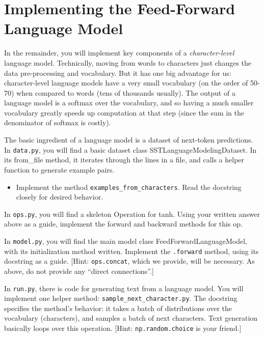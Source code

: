 \documentclass[11pt]{article}
\begin{document}
\section{Implementing the Feed-Forward Language Model}

In the remainder, you will implement key components of a \emph{character-level} language model.  Technically, moving from words to characters just changes the data pre-processing and vocabulary.  But it has one big advantage for us: character-level language models have a very small vocabulary (on the order of 50-70) when compared to words (tens of thousands usually).  The output of a language model is a softmax over the vocabulary, and so having a much smaller vocabulary greatly speeds up computation at that step (since the sum in the denominator of softmax is costly).

\vspace{2em}
 The basic ingredient of a language model is a dataset of next-token predictions. In \texttt{data.py}, you will find a basic dataset class SSTLanguageModelingDataset.  In its from\_file method, it iterates through the lines in a file, and calls a helper function to generate example pairs.
\begin{itemize}
  \item Implement the method \texttt{examples\_from\_characters}.  Read the docstring closely for desired behavior.
\end{itemize}

\vspace{2em}
  In \texttt{ops.py}, you will find a skeleton Operation for tanh.  Using your written answer above as a guide, implement the forward and backward methods for this op.

\vspace{2em}
 In \texttt{model.py}, you will find the main model class FeedForwardLanguageModel, with its initialization method written.  Implement the \texttt{.forward} method, using its docstring as a guide.  [Hint: \texttt{ops.concat}, which we provide, will be necessary.  As above, do not provide any ``direct connections''.]

\vspace{2em}
  In \texttt{run.py}, there is code for generating text from a language model.  You will implement one helper method: \texttt{sample\_next\_character.py}.  The docstring specifies the method's behavior: it takes a batch of distributions over the vocabulary (characters), and samples a batch of next characters.  Text generation basically loops over this operation. [Hint: \texttt{np.random.choice} is your friend.]
\end{document}
